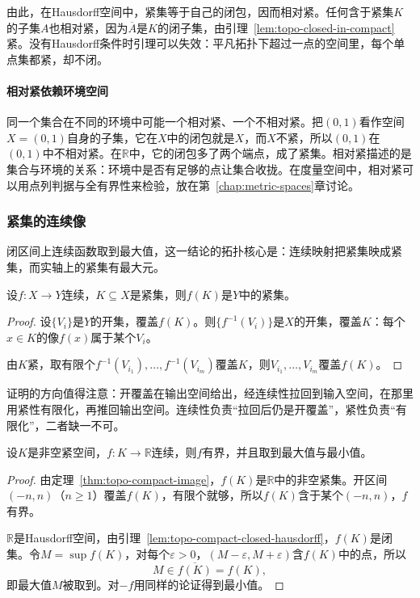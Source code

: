 由此，在Hausdorff空间中，紧集等于自己的闭包，因而相对紧。任何含于紧集$K$的子集$A$也相对紧，因为$\overline A$是$K$的闭子集，由引理~\ref{lem:topo-closed-in-compact}紧。没有Hausdorff条件时引理可以失效：平凡拓扑下超过一点的空间里，每个单点集都紧，却不闭。

\paragraph{相对紧依赖环境空间}
同一个集合在不同的环境中可能一个相对紧、一个不相对紧。把$(0,1)$看作空间$X=(0,1)$自身的子集，它在$X$中的闭包就是$X$，而$X$不紧，所以$(0,1)$在$(0,1)$中不相对紧。在$\mathbb R$中，它的闭包多了两个端点，成了紧集。相对紧描述的是集合与环境的关系：环境中是否有足够的点让集合收拢。在度量空间中，相对紧可以用点列判据与全有界性来检验，放在第~\ref{chap:metric-spaces}章讨论。

\subsubsection{紧集的连续像}
\label{sec:topo-compact-images}

闭区间上连续函数取到最大值，这一结论的拓扑核心是：连续映射把紧集映成紧集，而实轴上的紧集有最大元。

\begin{theorem}[紧集的连续像]
\label{thm:topo-compact-image}
设$f:X\to Y$连续，$K\subseteq X$是紧集，则$f(K)$是$Y$中的紧集。
\end{theorem}
\begin{proof}
设$\{V_i\}$是$Y$的开集，覆盖$f(K)$。则$\{f^{-1}(V_i)\}$是$X$的开集，覆盖$K$：每个$x\in K$的像$f(x)$属于某个$V_i$。

由$K$紧，取有限个$f^{-1}(V_{i_1}),\dots,f^{-1}(V_{i_m})$覆盖$K$，则$V_{i_1},\dots,V_{i_m}$覆盖$f(K)$。
\end{proof}

证明的方向值得注意：开覆盖在输出空间给出，经连续性拉回到输入空间，在那里用紧性有限化，再推回输出空间。连续性负责“拉回后仍是开覆盖”，紧性负责“有限化”，二者缺一不可。

\begin{theorem}[最大值与最小值]
\label{thm:topo-extreme-values}
设$K$是非空紧空间，$f:K\to\mathbb R$连续，则$f$有界，并且取到最大值与最小值。
\end{theorem}
\begin{proof}
由定理~\ref{thm:topo-compact-image}，$f(K)$是$\mathbb R$中的非空紧集。开区间$(-n,n)$（$n\geq1$）覆盖$f(K)$，有限个就够，所以$f(K)$含于某个$(-n,n)$，$f$有界。

$\mathbb R$是Hausdorff空间，由引理~\ref{lem:topo-compact-closed-hausdorff}，$f(K)$是闭集。令$M=\sup f(K)$，对每个$\varepsilon>0$，$(M-\varepsilon,M+\varepsilon)$含$f(K)$中的点，所以
\[
 M\in\overline{f(K)}=f(K),
\]
即最大值$M$被取到。对$-f$用同样的论证得到最小值。
\end{proof}

